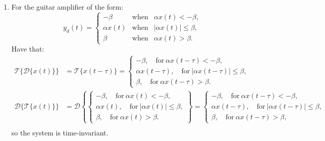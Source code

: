 \begin{enumerate}
\item For the guitar amplifier of the form:
\begin{equation*}
y_d(t) = \left\{
  \begin{array}{rcr}
    -\beta & \mathrm{when} & \alpha x(t)<-\beta, \\
    \alpha x(t) & \mathrm{when} & |\alpha x(t)| \le \beta, \\
    \beta & \mathrm{when} & \alpha x(t)>\beta.
\end{array}
\right.
\end{equation*}
Have that:
\begin{align*}
    \mathcal{T}\{\mathcal{D}\{x(t)\}\}&=\mathcal{T}\{x(t-\tau)\}=\begin{cases}
        -\beta, \quad \text{for}\ \alpha x(t-\tau)<-\beta,\\
        \alpha x(t-\tau), \quad \text{for}\ |\alpha x(t-\tau)|\le \beta,\\
        \beta, \quad \text{for}\ \alpha x(t-\tau)>\beta.
    \end{cases} \\
    \mathcal{D}\{\mathcal{T}\{x(t)\}\}&=\mathcal{D}\left\{\begin{cases}
        -\beta, \quad \text{for}\ \alpha x(t)<-\beta,\\
        \alpha x(t), \quad \text{for}\ |\alpha x(t)|\le \beta,\\
        \beta, \quad \text{for}\ \alpha x(t)>\beta.
    \end{cases}\right\}=\begin{cases}
        -\beta, \quad \text{for}\ \alpha x(t-\tau)<-\beta,\\
        \alpha x(t-\tau), \quad \text{for}\ |\alpha x(t-\tau)|\le \beta,\\
        \beta, \quad \text{for}\ \alpha x(t-\tau)>\beta,
    \end{cases} \\ 
\end{align*}
so the system is time-invariant. 


\end{enumerate}
